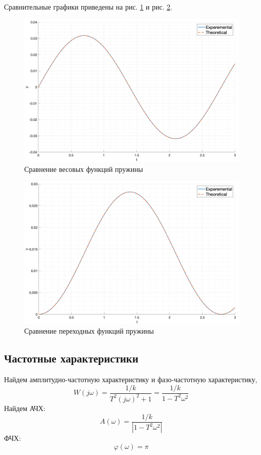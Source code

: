 Сравнительные графики приведены на рис. \ref{fig:task4_impulse_response_cmp} и рис. \ref{fig:task4_step_response_cmp}.
\begin{figure}[ht!]
    \centering
    \includegraphics[width=\textwidth]{media/plots/task4_impulse_response_cmp.png}
    \caption{Сравнение весовых функций пружины}
    \label{fig:task4_impulse_response_cmp}
\end{figure}
\begin{figure}[ht!]
    \centering
    \includegraphics[width=\textwidth]{media/plots/task4_step_response_cmp.png}
    \caption{Сравнение переходных функций пружины}
    \label{fig:task4_step_response_cmp}
\end{figure}

\FloatBarrier
\subsection{Частотные характеристики}
\noindent Найдем амплитудно-частотную характеристику и фазо-частотную характеристику,
\begin{equation}
    W(j\omega) = \frac{1/k}{T^2(j\omega)^2 + 1} = \frac{1/k}{1 - T^2\omega^2}
\end{equation}
Найдем АЧХ:
\begin{equation}
    A(\omega) = \frac{1/k}{|1 - T^2\omega^2|}
\end{equation}
ФЧХ:
\begin{equation}
    \varphi(\omega) = \pi
\end{equation}

